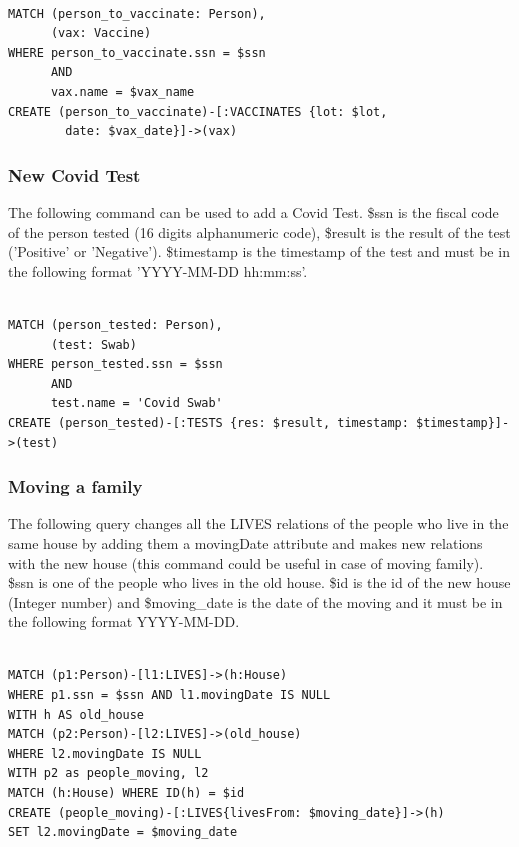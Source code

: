 \documentclass{article}
\begin{document}
\begin{lstlisting}[language=cypher, label=lst:cypher-example]

MATCH (person_to_vaccinate: Person),
      (vax: Vaccine)
WHERE person_to_vaccinate.ssn = $ssn
      AND
      vax.name = $vax_name
CREATE (person_to_vaccinate)-[:VACCINATES {lot: $lot,
        date: $vax_date}]->(vax)

\end{lstlisting}
\subsubsection{New Covid Test}
The following command can be used to add a Covid Test. \$ssn is the fiscal code of the person tested (16 digits alphanumeric code), \$result is the result of the test ('Positive' or 'Negative'). \$timestamp is the timestamp of the test and must be in the following format 'YYYY-MM-DD hh:mm:ss'.

\begin{lstlisting}[language=cypher, label=lst:cypher-example]

MATCH (person_tested: Person),
      (test: Swab)
WHERE person_tested.ssn = $ssn
      AND
      test.name = 'Covid Swab'
CREATE (person_tested)-[:TESTS {res: $result, timestamp: $timestamp}]->(test)

\end{lstlisting}
\subsubsection{Moving a family}
The following query changes all the LIVES relations of the people who live in the same house by adding them a movingDate attribute and makes new relations with the new house (this command could be useful in case of moving family).
\$ssn is one of the people who lives in the old house. \$id is the id of the new house (Integer number) and \$moving\_date is the date of the moving and it must be in the following format YYYY-MM-DD.


\begin{lstlisting}[language=cypher, label=lst:cypher-example]

MATCH (p1:Person)-[l1:LIVES]->(h:House)
WHERE p1.ssn = $ssn AND l1.movingDate IS NULL
WITH h AS old_house
MATCH (p2:Person)-[l2:LIVES]->(old_house)
WHERE l2.movingDate IS NULL
WITH p2 as people_moving, l2
MATCH (h:House) WHERE ID(h) = $id
CREATE (people_moving)-[:LIVES{livesFrom: $moving_date}]->(h)
SET l2.movingDate = $moving_date

\end{lstlisting}
\end{document}
